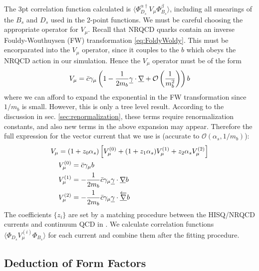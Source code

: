 The 3pt correlation function calculated is $\langle \Phi^{\alpha\dagger}_{D_s} V_{\mu} \Phi^{\beta}_{B_s} \rangle$, including all smearings of the $B_s$ and $D_s$ used in the 2-point functions. We must be careful choosing the appropriate operator for $V_{\mu}$. Recall that NRQCD quarks contain an inverse Fouldy-Wouthuysen (FW) transformation \eqref{eq:FoldyWoldy}. This must be encorparated into the $V_{\mu}$ operator, since it couples to the $b$ which obeys the NRQCD action in our simulation. Hence the $V_{\mu}$ operator must be of the form
\begin{align}
	V_{\mu} = \bar{c}\gamma_{\mu}\left( 1 - {1\over 2m_b} \underline{\gamma}\cdot\underline{\nabla} + \mathcal{O}\left({1\over m_b^2}\right) \right) b 
\end{align}
where we can afford to expand the exponential in the FW transformation since $1/m_b$ is small. However, this is only a tree level result. According to the discussion in sec. \ref{sec:renormalization}, these terms require renormalization constants, and also new terms in the above expansion may appear. Therefore the full expression for the vector current that we use is (accurate to $\mathcal{O}(\alpha_s,1/m_b)$):
\begin{align}
	\nonumber
	V_{\mu} &= (1+z_0 \alpha_s)\left[ V_{\mu}^{(0)} + (1 + z_1 \alpha_s) V_{\mu}^{(1)} + z_2 \alpha_s V_{\mu}^{(2)} \right] \\
	\nonumber
	& V_{\mu}^{(0)} = \bar{c}\gamma_{\mu} b \\
	\nonumber
	& V_{\mu}^{(1)} = -{1\over 2m_b} \bar{c} \gamma_{\mu}\underline{\gamma}\cdot\underline{\nabla} b \\
	\nonumber
	& V_{\mu}^{(2)} = -{1\over 2m_b} \bar{c} \gamma_{\mu}\underline{\gamma}\cdot\underline{\overleftarrow{\nabla}} b \\
	\label{eq:currentcorrections}
\end{align}
The coefficients $\{z_i\}$ are set by a matching procedure between the HISQ/NRQCD currents and continuum QCD in \cite{Monahan:2012dq}. We calculate correlation functions $\langle \Phi_{D_s} V^{(i)}_{\mu} \Phi_{B_s}\rangle$ for each current and combine them after the fitting procedure.

\subsection{Deduction of Form Factors}

